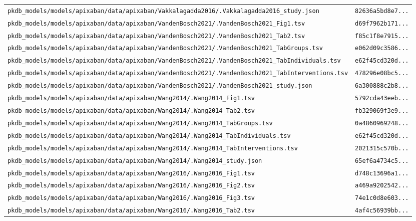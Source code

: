 \documentclass{article}
\begin{document}
\begin{longtable}{ll}
\texttt{pkdb\_models/models/apixaban/data/apixaban/Vakkalagadda2016/.Vakkalagadda2016\_study.json} & \texttt{82636a5bd8e7...} \\
\texttt{pkdb\_models/models/apixaban/data/apixaban/VandenBosch2021/.VandenBosch2021\_Fig1.tsv} & \texttt{d69f7962b171...} \\
\texttt{pkdb\_models/models/apixaban/data/apixaban/VandenBosch2021/.VandenBosch2021\_Tab2.tsv} & \texttt{f85c1f8e7915...} \\
\texttt{pkdb\_models/models/apixaban/data/apixaban/VandenBosch2021/.VandenBosch2021\_TabGroups.tsv} & \texttt{e062d09c3586...} \\
\texttt{pkdb\_models/models/apixaban/data/apixaban/VandenBosch2021/.VandenBosch2021\_TabIndividuals.tsv} & \texttt{e62f45cd320d...} \\
\texttt{pkdb\_models/models/apixaban/data/apixaban/VandenBosch2021/.VandenBosch2021\_TabInterventions.tsv} & \texttt{478296e08bc5...} \\
\texttt{pkdb\_models/models/apixaban/data/apixaban/VandenBosch2021/.VandenBosch2021\_study.json} & \texttt{6a300888c2b8...} \\
\texttt{pkdb\_models/models/apixaban/data/apixaban/Wang2014/.Wang2014\_Fig1.tsv} & \texttt{5792cda43eeb...} \\
\texttt{pkdb\_models/models/apixaban/data/apixaban/Wang2014/.Wang2014\_Tab2.tsv} & \texttt{fb329069f3e9...} \\
\texttt{pkdb\_models/models/apixaban/data/apixaban/Wang2014/.Wang2014\_TabGroups.tsv} & \texttt{0a4860969248...} \\
\texttt{pkdb\_models/models/apixaban/data/apixaban/Wang2014/.Wang2014\_TabIndividuals.tsv} & \texttt{e62f45cd320d...} \\
\texttt{pkdb\_models/models/apixaban/data/apixaban/Wang2014/.Wang2014\_TabInterventions.tsv} & \texttt{2021315c570b...} \\
\texttt{pkdb\_models/models/apixaban/data/apixaban/Wang2014/.Wang2014\_study.json} & \texttt{65ef6a4734c5...} \\
\texttt{pkdb\_models/models/apixaban/data/apixaban/Wang2016/.Wang2016\_Fig1.tsv} & \texttt{d748c13696a1...} \\
\texttt{pkdb\_models/models/apixaban/data/apixaban/Wang2016/.Wang2016\_Fig2.tsv} & \texttt{a469a9202542...} \\
\texttt{pkdb\_models/models/apixaban/data/apixaban/Wang2016/.Wang2016\_Fig3.tsv} & \texttt{74e1c0d8e603...} \\
\texttt{pkdb\_models/models/apixaban/data/apixaban/Wang2016/.Wang2016\_Tab2.tsv} & \texttt{4af4c56939bb...} \\

\end{longtable}
\end{document}
